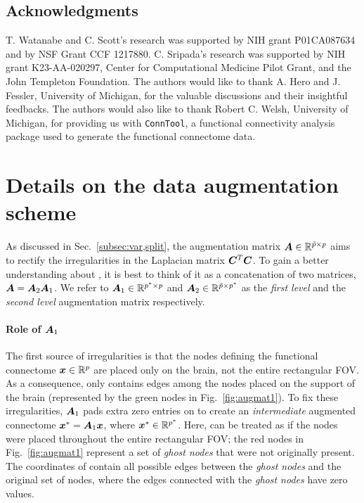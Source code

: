 \subsection*{Acknowledgments}
T. Watanabe and C. Scott's research was supported by NIH grant P01CA087634 and by NSF Grant CCF 1217880.
C. Sripada's research was supported by NIH grant {K23-AA-020297}, Center for Computational Medicine Pilot Grant, and the John Templeton Foundation.
The authors would like to thank A. Hero and J. Fessler, University of Michigan, for the valuable discussions and their insightful feedbacks.
The authors would also like to thank Robert C. Welsh, University of Michigan, for providing us with \texttt{ConnTool}, a functional connectivity analysis package used to generate the functional connectome data.

\appendix 
\setcounter{figure}{0}

\section{Details on the data augmentation scheme}
\label{appendix:data,aug}

As discussed in Sec.~\ref{subsec:var,split}, the augmentation matrix ${\bm{A}}\in\mathbb{R}^{{\tilde{p}}\times p}$ aims to rectify the irregularities in the Laplacian matrix ${\bm{C}}^T{\bm{C}}$.
To gain a better understanding about \A, it is best to think of it as a concatenation of two matrices, ${{\bm{A}}={\bm{A}}_2{\bm{A}}_1}$.
We refer to ${\bm{A}}_1\in\mathbb{R}^{{p^*}\times p}$ and ${\bm{A}}_2\in\mathbb{R}^{{\tilde{p}}\times {\ensuremath{p^*}}}$ as the \emph{first level} and the \emph{second level} augmentation matrix respectively.

\paragraph{Role of ${\bm{A}}_1$}
The first source of irregularities is that the nodes defining the functional connectome ${\bm{x}}\in\mathbb{R}^p$ are placed only on the brain, not the entire rectangular FOV.
As a consequence, \x only contains edges among the nodes placed on the support of the brain (represented by the green nodes in Fig.~\ref{fig:augmat1}).
To fix these irregularities, ${\bm{A}}_1$ pads extra zero entries on \x to create an \emph{intermediate} augmented connectome ${\bm{x}}^*={\bm{A}}_1{\bm{x}}$, where ${\bm{x}}^*\in\mathbb{R}^{p^*}$.
Here, \xstar can be treated as if the nodes were placed throughout the entire rectangular FOV; the red nodes in Fig.~\ref{fig:augmat1} represent a set of \emph{ghost nodes} that were not originally present. 
The coordinates of \xstar contain all possible edges between the \emph{ghost nodes} and the original set of nodes, where the edges connected with the \emph{ghost nodes} have zero values.

